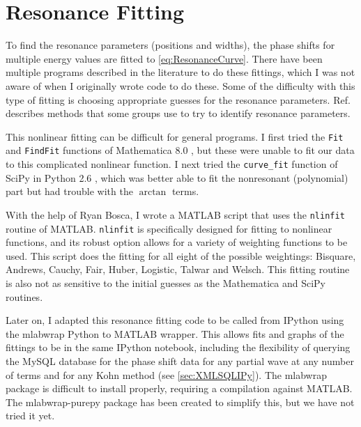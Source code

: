 \documentclass[Dissertation.tex]{subfiles}
\begin{document}
\section{Resonance Fitting}
\label{sec:ResonanceFit}

To find the resonance parameters (positions and widths), the phase shifts for 
multiple energy values are fitted to \cref{eq:ResonanceCurve}. There have 
been multiple programs described in the literature
\cite{Tennyson1984, Stibbe1998, Sochi2013} to do these fittings, which I
was not aware of when I 
originally wrote code to do these. Some of the difficulty with this type of 
fitting is choosing appropriate guesses for the resonance parameters.
Ref.~\cite{Sochi2013} describes methods that some groups use to try to identify 
resonance parameters.

This nonlinear fitting can be difficult for general programs. I first tried 
the \texttt{Fit} and \texttt{FindFit} functions of
Mathematica\textsuperscript{\textregistered} 8.0 \cite{Mathematica}, but these were unable to fit our 
data to this complicated nonlinear function. I next tried the
\texttt{curve\_fit} function of SciPy \cite{SciPy} in Python\textsuperscript{\textregistered}
2.6 \cite{Python}, which was better able to fit the nonresonant (polynomial) 
part but had trouble with the $\arctan$ terms.

With the help of Ryan Bosca, I wrote a MATLAB\textsuperscript{\textregistered}
\cite{matlab} script that uses the \texttt{nlinfit} routine of MATLAB. 
\texttt{nlinfit} is specifically designed for fitting to nonlinear functions, 
and its robust option allows for a variety of weighting functions to be used. 
This script does the fitting for all eight of the possible weightings: 
Bisquare, Andrews, Cauchy, Fair, Huber, Logistic, Talwar and Welsch. This 
fitting routine is also not as sensitive to the initial guesses as the 
Mathematica and SciPy routines.

Later on, I adapted this resonance fitting code to be called from IPython 
\cite{ipython} using the mlabwrap \cite{mlabwrap} Python to MATLAB wrapper. 
This allows fits and graphs of the fittings to be in the same IPython 
notebook, including the flexibility of querying the MySQL database for the 
phase shift data for any partial wave at any number of terms and for
any Kohn method
(see \cref{sec:XMLSQLIPy}). The mlabwrap package is difficult to install properly, 
requiring a compilation against MATLAB. The mlabwrap-purepy package
\cite{mlabwrappurepy} has been created to simplify this, but we have not tried it 
yet.
\end{document}
